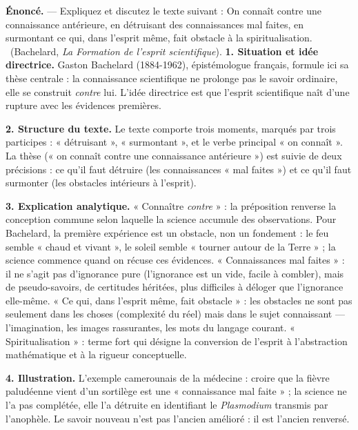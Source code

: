 \documentclass[11pt]{article}
\begin{document}
\begin{exoresolu}
\textbf{Énoncé.} — Expliquez et discutez le texte suivant : \guillemotleft On connaît contre une connaissance antérieure, en détruisant des connaissances mal faites, en surmontant ce qui, dans l'esprit même, fait obstacle à la spiritualisation. \guillemotright\ (Bachelard, \emph{La Formation de l'esprit scientifique}).
\tcblower
\textbf{1. Situation et idée directrice.} Gaston Bachelard (1884-1962), épistémologue français, formule ici sa thèse centrale : la connaissance scientifique ne prolonge pas le savoir ordinaire, elle se construit \emph{contre} lui. L'idée directrice est que l'esprit scientifique naît d'une rupture avec les évidences premières.

\textbf{2. Structure du texte.} Le texte comporte trois moments, marqués par trois participes : « détruisant », « surmontant », et le verbe principal « on connaît ». La thèse (« on connaît contre une connaissance antérieure ») est suivie de deux précisions : ce qu'il faut détruire (les connaissances « mal faites ») et ce qu'il faut surmonter (les obstacles intérieurs à l'esprit).

\textbf{3. Explication analytique.} « Connaître \emph{contre} » : la préposition renverse la conception commune selon laquelle la science accumule des observations. Pour Bachelard, la première expérience est un obstacle, non un fondement : le feu semble « chaud et vivant », le soleil semble « tourner autour de la Terre » ; la science commence quand on récuse ces évidences. « Connaissances mal faites » : il ne s'agit pas d'ignorance pure (l'ignorance est un vide, facile à combler), mais de pseudo-savoirs, de certitudes héritées, plus difficiles à déloger que l'ignorance elle-même. « Ce qui, dans l'esprit même, fait obstacle » : les obstacles ne sont pas seulement dans les choses (complexité du réel) mais dans le sujet connaissant — l'imagination, les images rassurantes, les mots du langage courant. « Spiritualisation » : terme fort qui désigne la conversion de l'esprit à l'abstraction mathématique et à la rigueur conceptuelle.

\textbf{4. Illustration.} L'exemple camerounais de la médecine : croire que la fièvre paludéenne vient d'un sortilège est une « connaissance mal faite » ; la science ne l'a pas complétée, elle l'a détruite en identifiant le \emph{Plasmodium} transmis par l'anophèle. Le savoir nouveau n'est pas l'ancien amélioré : il est l'ancien renversé.


\end{exoresolu}
\end{document}
